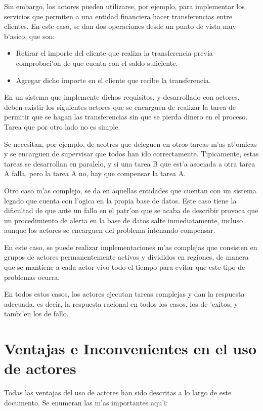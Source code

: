 \documentclass[12pt]{article}
\begin{document}
Sin embargo, los actores pueden utilizarse, por ejemplo, para implementar los servicios que permiten
a una entidad financiera hacer transferencias entre clientes. En este caso, se dan dos operaciones desde
un punto de vista muy b'asico, que son:

\begin{itemize}
	\item Retirar el importe del cliente que realiza la transferencia previa comprobaci'on
    de que cuenta con el saldo suficiente.
	\item Agregar dicho importe en el cliente que recibe la transferencia.
\end{itemize}

En un sistema que implemente dichos requisitos, y desarrollado con actores, deben existir los siguientes
actores que se encarguen de realizar la tarea de permitir que se hagan las transferencias sin
que se pierda dinero en el proceso. Tarea que por otro lado no es simple.

Se necesitan, por ejemplo, de acotres que deleguen en otros tareas m'as at'omicas y se encarguen de
supervisar que todos han ido correctamente. Tipicamente, estas tareas se desarrollan en paralelo, y si
una tarea B que est'a asociada a otra tarea A falla, pero la tarea A no, hay que compensar la tarea A.

Otro caso m'as complejo, se da en aquellas entidades que cuentan con un sistema legado que cuenta
con l'ogica en la propia base de datos. Este caso tiene la dificultad de que ante un fallo en el patr'on
que se acaba de describir provoca que un procedimiento de alerta en la base de datos salte
inmediatamente, incluso aunque los actores se encarguen del problema intenando compensar.

En este caso, se puede realizar implementaciones m'as complejas que consisten en grupos de actores
permanentemente activos y divididos en regiones, de manera que se mantiene a cada actor vivo
todo el tiempo para evitar que este tipo de problemas ocurra.

En todos estos casos, los actores ejecutan tareas complejas y dan la respuesta adecuada, es decir, la
respuesta racional en todos los casos, los de 'exitos, y tambi'en los de fallo.

\section{Ventajas e Inconvenientes en el uso de actores}
\label{sec:ventajas e inconvenientes}
Todas las ventajas del uso de actores han sido descritas a lo largo de este documento. Se enumeran las
m'as importantes aqu'i:
\end{document}
